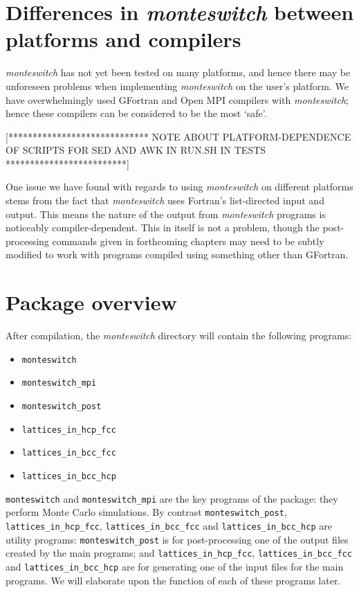 \documentclass{report}
\begin{document}
\section{Differences in \emph{monteswitch} between platforms and compilers}
\emph{monteswitch} has not yet been tested on many platforms, and hence there may be unforeseen problems when implementing \emph{monteswitch} on
the user's platform. We have overwhelmingly used GFortran and Open MPI compilers with \emph{monteswitch}; hence these compilers can be considered 
to be the most `safe'.

[***************************** NOTE ABOUT PLATFORM-DEPENDENCE OF SCRIPTS FOR SED AND AWK IN RUN.SH IN TESTS *************************]

One issue we have found with regards to using \emph{monteswitch} on different platforms stems from the fact that \emph{monteswitch} uses Fortran's 
list-directed input and output. This means the nature of the output from \emph{monteswitch} programs is noticeably compiler-dependent. This in itself
is not a problem, though the post-processing commands given in forthcoming chapters may need to be subtly modified to work with programs compiled using 
something other than GFortran.

\section{Package overview}
After compilation, the \emph{monteswitch} directory will contain the following programs:
\begin{itemize}
\item\texttt{monteswitch}
\item\texttt{monteswitch\_mpi}
\item\texttt{monteswitch\_post}
\item\texttt{lattices\_in\_hcp\_fcc}
\item\texttt{lattices\_in\_bcc\_fcc}
\item\texttt{lattices\_in\_bcc\_hcp}
\end{itemize}
\texttt{monteswitch} and \texttt{monteswitch\_mpi} are the key programs of the package: they perform Monte Carlo simulations. 
By contrast \texttt{monteswitch\_post}, \texttt{lattices\_in\_hcp\_fcc}, \texttt{lattices\_in\_bcc\_fcc} and 
\texttt{lattices\_in\_bcc\_hcp} are utility programs: \texttt{monteswitch\_post} is for post-processing one of the output files created 
by the main programs; and \texttt{lattices\_in\_hcp\_fcc}, \texttt{lattices\_in\_bcc\_fcc} and \texttt{lattices\_in\_bcc\_hcp} are for generating 
one of the input files for the main programs. We will elaborate upon the function of each of these programs later.
\end{document}
